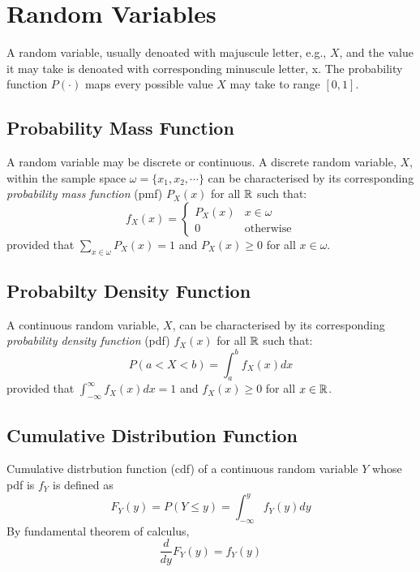 \section{Random Variables}

A random variable, usually denoated with majuscule letter, e.g., $X$, and the value it may take is denoated with corresponding minuscule letter, x. The probability function $P(\cdot)$ maps every possible value $X$ may take to range $[0, 1]$.

\subsection{Probability Mass Function}
A random variable may be discrete or continuous. A discrete random variable, $X$, within the sample space $\omega =\{x_1, x_2, \cdots \}$
can be characterised by its corresponding \textit{probability mass function} (pmf) $P_X(x)$ for all $\mathbb{R}$ such that:
\begin{equation}
	f_X(x)=
	\begin{cases}
		P_X(x) & x\in \omega\\
		0 & \text{otherwise}
	\end{cases}
\end{equation}
provided that $\sum_{x\in \omega} P_X(x)=1$ and $P_X(x)\geq 0$ for all $x\in \omega$.

\subsection{Probabilty Density Function}
A continuous random variable, $X$, can be characterised by its corresponding \textit{probability density function} (pdf) $f_X(x)$ for all $\mathbb{R}$ such that:
\begin{equation}
	P(a<X<b)=\int^b_a f_X(x)dx
\end{equation}
provided that $\int^{\infty}_{-\infty} f_X(x)dx=1$ and $f_X(x)\geq 0$ for all $x\in \mathbb{R}$.

\subsection{Cumulative Distribution Function}
Cumulative distrbution function (cdf) of a continuous random variable $Y$ whose pdf is $f_Y$ is defined as 
\begin{equation}
	F_Y(y) = P(Y\leq y) = \int^y_{-\infty}f_Y(y)dy
\end{equation}
By fundamental theorem of calculus, 
\begin{equation}
	\frac{d}{dy}F_Y(y) = f_Y(y)
\end{equation}


